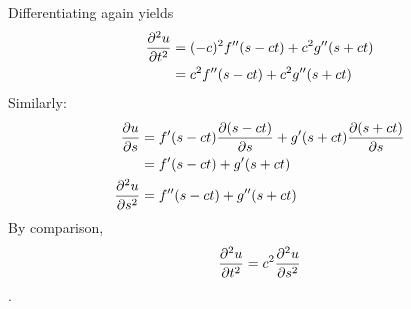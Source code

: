 Differentiating again yields
\begin{align*}
  \frac{\partial^2u}{\partial t^2} &= ( -c)^2 f''(s-ct) + c^2g''(s+ct) \\& =  c^2 f''(s-ct) + c^2g''(s+ct)
\end{align*}
Similarly:
\begin{align*}
  \frac{\partial u}{\partial s} &= f'(s-ct)\frac{\partial (s-ct)}{\partial s} + g'(s+ct)\frac{\partial (s+ct)}{\partial s} \\& = f'(s-ct) + g'(s+ct) \\
  \frac{\partial^2 u}{\partial s^2} &= f''(s-ct) + g''(s+ct) 
\end{align*}
By comparison, \begin{align*}\frac{\partial^2u}{\partial t^2} = c^2\frac{\partial^2 u}{\partial s^2} \end{align*}.


\EEN %

\newpage

